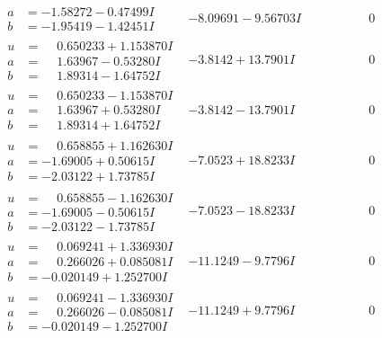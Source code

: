 \documentclass[1p]{elsarticle_modified}
\theoremstyle{definition}
\begin{document}
$$\begin{array}{c|c|c}
\begin{aligned}
a &= -1.58272 - 0.47499 I \\
b &= -1.95419 - 1.42451 I\end{aligned}
 & -8.09691 - 9.56703 I & \phantom{-0.000000 } 0 \\ \hline\begin{aligned}
u &= \phantom{-}0.650233 + 1.153870 I \\
a &= \phantom{-}1.63967 - 0.53280 I \\
b &= \phantom{-}1.89314 - 1.64752 I\end{aligned}
 & -3.8142 + 13.7901 I & \phantom{-0.000000 } 0 \\ \hline\begin{aligned}
u &= \phantom{-}0.650233 - 1.153870 I \\
a &= \phantom{-}1.63967 + 0.53280 I \\
b &= \phantom{-}1.89314 + 1.64752 I\end{aligned}
 & -3.8142 - 13.7901 I & \phantom{-0.000000 } 0 \\ \hline\begin{aligned}
u &= \phantom{-}0.658855 + 1.162630 I \\
a &= -1.69005 + 0.50615 I \\
b &= -2.03122 + 1.73785 I\end{aligned}
 & -7.0523 + 18.8233 I & \phantom{-0.000000 } 0 \\ \hline\begin{aligned}
u &= \phantom{-}0.658855 - 1.162630 I \\
a &= -1.69005 - 0.50615 I \\
b &= -2.03122 - 1.73785 I\end{aligned}
 & -7.0523 - 18.8233 I & \phantom{-0.000000 } 0 \\ \hline\begin{aligned}
u &= \phantom{-}0.069241 + 1.336930 I \\
a &= \phantom{-}0.266026 + 0.085081 I \\
b &= -0.020149 + 1.252700 I\end{aligned}
 & -11.1249 - 9.7796 I & \phantom{-0.000000 } 0 \\ \hline\begin{aligned}
u &= \phantom{-}0.069241 - 1.336930 I \\
a &= \phantom{-}0.266026 - 0.085081 I \\
b &= -0.020149 - 1.252700 I\end{aligned}
 & -11.1249 + 9.7796 I & \phantom{-0.000000 } 0 \\ \hline\begin{aligned}

\end{aligned}
\end{array}$$
\end{document}
